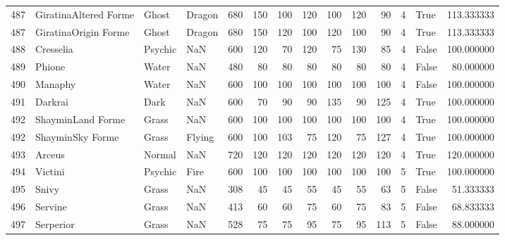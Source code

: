 \begin{tabular}{rlllrrrrrrrrlr}
 487 &      GiratinaAltered Forme &     Ghost &    Dragon &    680 &  150 &     100 &      120 &      100 &      120 &     90 &           4 &       True &  113.333333 \\
 487 &       GiratinaOrigin Forme &     Ghost &    Dragon &    680 &  150 &     120 &      100 &      120 &      100 &     90 &           4 &       True &  113.333333 \\
 488 &                  Cresselia &   Psychic &       NaN &    600 &  120 &      70 &      120 &       75 &      130 &     85 &           4 &      False &  100.000000 \\
 489 &                     Phione &     Water &       NaN &    480 &   80 &      80 &       80 &       80 &       80 &     80 &           4 &      False &   80.000000 \\
 490 &                    Manaphy &     Water &       NaN &    600 &  100 &     100 &      100 &      100 &      100 &    100 &           4 &      False &  100.000000 \\
 491 &                    Darkrai &      Dark &       NaN &    600 &   70 &      90 &       90 &      135 &       90 &    125 &           4 &       True &  100.000000 \\
 492 &          ShayminLand Forme &     Grass &       NaN &    600 &  100 &     100 &      100 &      100 &      100 &    100 &           4 &       True &  100.000000 \\
 492 &           ShayminSky Forme &     Grass &    Flying &    600 &  100 &     103 &       75 &      120 &       75 &    127 &           4 &       True &  100.000000 \\
 493 &                     Arceus &    Normal &       NaN &    720 &  120 &     120 &      120 &      120 &      120 &    120 &           4 &       True &  120.000000 \\
 494 &                    Victini &   Psychic &      Fire &    600 &  100 &     100 &      100 &      100 &      100 &    100 &           5 &       True &  100.000000 \\
 495 &                      Snivy &     Grass &       NaN &    308 &   45 &      45 &       55 &       45 &       55 &     63 &           5 &      False &   51.333333 \\
 496 &                    Servine &     Grass &       NaN &    413 &   60 &      60 &       75 &       60 &       75 &     83 &           5 &      False &   68.833333 \\
 497 &                  Serperior &     Grass &       NaN &    528 &   75 &      75 &       95 &       75 &       95 &    113 &           5 &      False &   88.000000 \\

\end{tabular}
